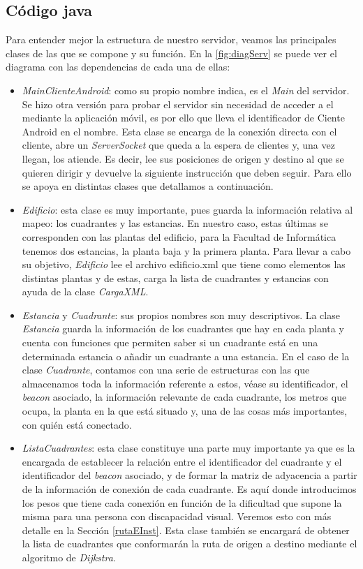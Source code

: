 \subsection{Código java}
Para entender mejor la estructura de nuestro servidor, veamos las principales clases de las que se compone y su función. En la \ref{fig:diagServ} se puede ver el diagrama con las dependencias de cada una de ellas:

\begin{itemize}
	\item \textit{MainClienteAndroid}: como su propio nombre indica, es el \textit{Main} del servidor. Se hizo otra versión para probar el servidor sin necesidad de acceder a el mediante la aplicación móvil, es por ello que lleva el identificador de Ciente Android en el nombre. Esta clase se encarga de la conexión directa con el cliente, abre un \textit{ServerSocket} que queda a la espera de clientes y, una vez llegan, los atiende. Es decir, lee sus posiciones de origen y destino al que se quieren dirigir y devuelve la siguiente instrucción que deben seguir. Para ello se apoya en distintas clases que detallamos a continuación. 
	
	\item \textit{Edificio}: esta clase es muy importante, pues guarda la información relativa al mapeo: los cuadrantes y las estancias. En nuestro caso, estas últimas se corresponden con las plantas del edificio, para la Facultad de Informática tenemos dos estancias, la planta baja y la primera planta. Para llevar a cabo su objetivo, \textit{Edificio} lee el archivo edificio.xml que tiene como elementos las distintas plantas y de estas, carga la lista de cuadrantes y estancias con ayuda de la clase \textit{CargaXML}.
	
	\item \textit{Estancia} y \textit{Cuadrante}: sus propios nombres son muy descriptivos. La clase  \textit{Estancia} guarda la información de los cuadrantes que hay en cada planta y cuenta con funciones que permiten saber si un cuadrante está en una determinada estancia o añadir un cuadrante a una estancia. En el caso de la clase \textit{Cuadrante}, contamos con una serie de estructuras con las que almacenamos toda la información referente a estos, véase su identificador, el \textit{beacon} asociado, la información relevante de cada cuadrante, los metros que ocupa, la planta en la que está situado y, una de las cosas más importantes, con quién está conectado. 
	
	\item \textit{ListaCuadrantes}: esta clase constituye una parte muy importante ya que es la encargada de establecer la relación entre el identificador del cuadrante y el identificador del \textit{beacon} asociado, y de formar la matriz de adyacencia a partir de la información de conexión de cada cuadrante. Es aquí donde introducimos los pesos que tiene cada conexión en función de la dificultad que supone la misma para una persona con discapacidad visual. Veremos esto con más detalle en la Sección \ref{rutaEInst}. Esta clase también se encargará de obtener la lista de cuadrantes que conformarán la ruta de origen a destino mediante el algoritmo de \textit{Dijkstra}.
	

\end{itemize}
